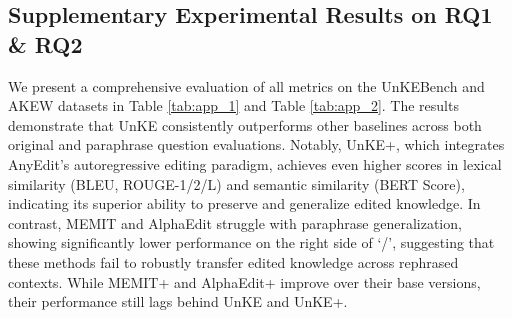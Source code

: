 \subsection{Supplementary Experimental Results on RQ1 \& RQ2} \label{app:exp_result_1}
We present a comprehensive evaluation of all metrics on the UnKEBench and AKEW datasets in Table \ref{tab:app_1} and Table \ref{tab:app_2}. The results demonstrate that UnKE consistently outperforms other baselines across both original and paraphrase question evaluations. Notably, UnKE+, which integrates AnyEdit’s autoregressive editing paradigm, achieves even higher scores in lexical similarity (BLEU, ROUGE-1/2/L) and semantic similarity (BERT Score), indicating its superior ability to preserve and generalize edited knowledge. In contrast, MEMIT and AlphaEdit struggle with paraphrase generalization, showing significantly lower performance on the right side of `/', suggesting that these methods fail to robustly transfer edited knowledge across rephrased contexts. While MEMIT+ and AlphaEdit+ improve over their base versions, their performance still lags behind UnKE and UnKE+.

